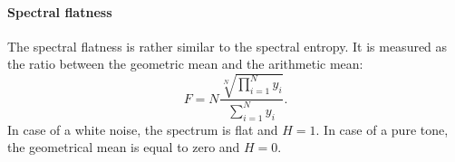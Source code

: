 \paragraph{Spectral flatness}
The spectral flatness is rather similar to the spectral entropy. It is measured as the ratio between the geometric mean and the arithmetic mean:
\begin{equation}
\label{eq:spec_flat}
	F = N \frac{\sqrt[N]{\prod\limits_{i=1}^{N} y_i}}{\sum \limits_{i=1}^{N} y_i}.
\end{equation}
In case of a white noise, the spectrum is flat and $H=1$. In case of a pure tone, the geometrical mean is equal to zero and $H=0$.
%
%
%
